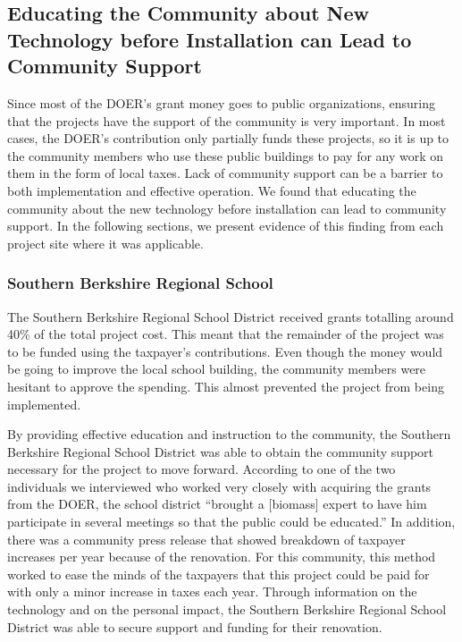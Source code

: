 \subsection{Educating the Community about New Technology before Installation can Lead to Community Support}
\par Since most of the DOER’s grant money goes to public organizations, ensuring that the projects have the support of the community is very important. In most cases, the DOER’s contribution only partially funds these projects, so it is up to the community members who use these public buildings to pay for any work on them in the form of local taxes. Lack of community support can be a barrier to both implementation and effective operation. We found that educating the community about the new technology before installation can lead to community support. In the following sections, we present evidence of this finding from each project site where it was applicable.

\subsubsection{Southern Berkshire Regional School}
\par The Southern Berkshire Regional School District received grants totalling around 40\% of the total project cost. This meant that the remainder of the project was to be funded using the taxpayer’s contributions. Even though the money would be going to improve the local school building, the community members were hesitant to approve the spending. This almost prevented the project from being implemented.
\par By providing effective education and instruction to the community, the Southern Berkshire Regional School District was able to obtain the community support necessary for the project to move forward. According to one of the two individuals we interviewed who worked very closely with acquiring the grants from the DOER, the school district “brought a [biomass] expert to have him participate in several meetings so that the public could be educated.” In addition, there was a community press release that showed breakdown of taxpayer increases per year because of the renovation. For this community, this method worked to ease the minds of the taxpayers that this project could be paid for with only a minor increase in taxes each year. Through information on the technology and on the personal impact, the Southern Berkshire Regional School District was able to secure support and funding for their renovation.

